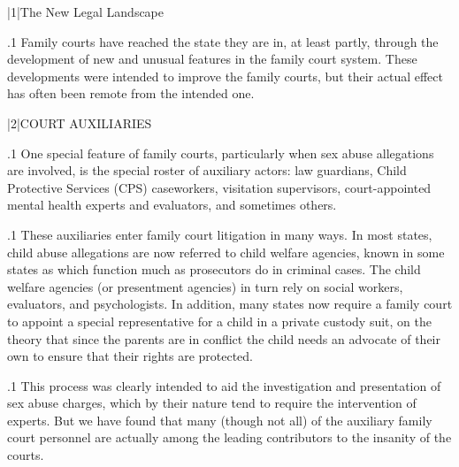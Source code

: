 \documentclass[11pt, twoside]{article}
\begin{document}
\thispagestyle{empty}

{\fontsize{13}{19}\selectfont


\hspace{-5em}\begin{minipage}{1.1\textwidth}
\begin{flushright}
{\fontsize{14}{22}\selectfont
\textbf{%
}
}
\end{flushright}
\end{minipage}


\vspace{6em}





\s|1|{The New Legal Landscape}

\p.1{%
\noindent{}Family courts have reached the state they are in, at least partly, through
the development of new and unusual features in the family court system.
These developments were intended to improve the family courts, but
their actual effect has often been remote from the intended one.
}%


\s|2|{COURT AUXILIARIES}

\p.1{%
\noindent{}One special feature of family courts, particularly when sex abuse allegations are involved, is the special roster of auxiliary actors: law
guardians, Child Protective Services (CPS) caseworkers, visitation supervisors, court-appointed mental health experts and evaluators, and
sometimes others.
}%

\p.1{%
These auxiliaries enter family court litigation in many ways. In most
states, child abuse allegations are now referred to child welfare agencies, known in some states as  which function
much as prosecutors do in criminal cases. The child welfare agencies (or
presentment agencies) in turn rely on social workers, evaluators, and
psychologists. In addition, many states now require a family court to
appoint a special representative for a child in a private custody suit, on
the theory that since the parents are in conflict the child needs an advocate
of their own to ensure that their rights are protected.
}%

\p.1{%
This process was clearly intended to aid the investigation and presentation of sex abuse charges, which by their nature tend to require the
intervention of experts. But we have found that many (though not all)
of the auxiliary family court personnel are actually among the leading
contributors to the insanity of the courts.
}%

}
\end{document}
